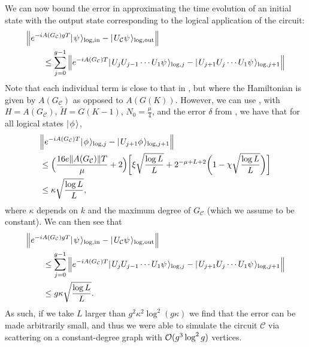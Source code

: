 \documentclass[../thesis-main/thesis-main]{subfiles}
\begin{document}
We can now bound the error in approximating the time evolution of an initial state with the output state corresponding to the logical application of the circuit:
\begin{align}
  &\Big \Vert e^{ -i A(G_{\mathcal{C}} )g T} |\mspace{2mu} \psi \mspace{2mu} \rangle_{\text{log},\text{in}} - |\mspace{2mu} U_{\mathcal{C}} \psi \mspace{2mu} \rangle_{\text{log},\text{out}}\Big \Vert\nonumber\\
  & \qquad \leq \sum_{j = 0}^{g-1} \Big \Vert e^{ -i A(G_{\mathcal{C}})T} |\mspace{2mu} U_{j} U_{j-1}\cdots U_1 \psi \mspace{2mu} \rangle_{\text{log},j} - |\mspace{2mu} U_{j+1}U_{j} \cdots U_1 \psi \mspace{2mu} \rangle_{\text{log},j+1}\Big \Vert
\end{align}
Note that each individual term is close to that in , but where the Hamiltonian is given by $A(G_{\mathcal{C}})$ as opposed to $A(G(K))$.  However, we can use , with $H = A(G_{\mathcal{C}})$, $\tilde{H} = G(K-1)$,  $N_0 = \frac{\mu}{4}$, and the error $\delta$ from , we have that for all logical states $|\mspace{2mu} \phi \mspace{2mu} \rangle$,
\begin{align}
   &\Big \Vert e^{ -i A(G_{\mathcal{C}})T} |\mspace{2mu} \phi \mspace{2mu} \rangle_{\text{log},j} - |\mspace{2mu} U_{j+1}\phi \mspace{2mu} \rangle_{\text{log},j+1}\Big \Vert\nonumber\\
   &\leq \Big(\frac{ 16 e \|{A(G_{\mathcal{C}})}\| T}{\mu} + 2\Big)\bigg[ \xi \sqrt{\frac{\log L}{L}} + 2^{- \mu + L +2} \bigg(1 -   \chi \sqrt{\frac{\log L}{L}} \bigg)\bigg]\\
   & \leq \kappa \sqrt{\frac{\log L}{L}},
\end{align}
where $\kappa$ depends on $k$ and the maximum degree of $G_{\mathcal{C}}$ (which we assume to be constant).  We can then see that
\begin{align}
  &\Big \Vert e^{- i A(G_{\mathcal{C}} )g T} |\mspace{2mu} \psi \mspace{2mu} \rangle_{\text{log},\text{in}} - |\mspace{2mu} U_{\mathcal{C}} \psi \mspace{2mu} \rangle_{\text{log},\text{out}}\Big \Vert\nonumber\\
  & \qquad \leq \sum_{j = 0}^{g-1} \Big \Vert e^{ -i A(G_{\mathcal{C}})T} |\mspace{2mu} U_{j} U_{j-1}\cdots U_1 \psi \mspace{2mu} \rangle_{\text{log},j} - |\mspace{2mu} U_{j+1}U_{j} \cdots U_1 \psi \mspace{2mu} \rangle_{\text{log},j+1}\Big \Vert\\
  &\qquad \leq g\kappa \sqrt{\frac{\log L}{L}}.
\end{align}
As such, if we take $L$ larger than $g^2\kappa^2\log^2(g\kappa)$ we find that the error can be made arbitrarily small, and thus we were able to simulate the circuit $\mathcal{C}$ via scattering on a constant-degree graph with $\mathcal{O}(g^3 \log^2 g)$ vertices.


\end{document}
